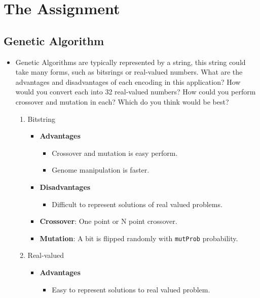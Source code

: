 \documentclass{article}
\begin{document}
\newpage


\newpage
\section{The Assignment}

\subsection{Genetic Algorithm}
\begin{itemize}
	\item Genetic Algorithms are typically represented by a string, this string could take many forms, such as bitsrings or real-valued numbers. What are the advantages and disadvantages of each encoding in this application? How would you convert each into 32 real-valued numbers? How could you perform crossover and mutation in each? Which do you think would be best?
	\begin{enumerate}
		\item Bitstring
		\color{blue}
        \begin{itemize}
            \item \textbf{Advantages}
                \begin{itemize}
                    \item Crossover and mutation is easy perform.
                    \item Genome manipulation is faster.
                \end{itemize}
            \item \textbf{Disadvantages}
                \begin{itemize}
                    \item Difficult to represent solutions of real valued problems.
                \end{itemize}
            \item \textbf{Crossover}: One point or N point crossover.
            \item \textbf{Mutation}: A bit is flipped randomly with \texttt{mutProb} probability.
        \end{itemize}
        \color{black}
		\item Real-valued
		\color{blue}
        \begin{itemize}
            \item \textbf{Advantages}
                \begin{itemize}
                    \item Easy to represent solutions to real valued problem.

\end{itemize}
\end{itemize}
\end{enumerate}
\end{itemize}
\end{document}
